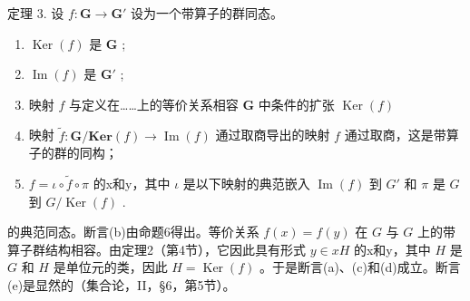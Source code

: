 定理 3. 设 \(f: \mathbf{G} \to \mathbf{G}'\) 设为一个带算子的群同态。

\begin{enumerate}
\def\labelenumi{(\alph{enumi})}
\item
  \(\operatorname{Ker}(f)\) 是 \(\mathbf{G}\) ;
\item
  \(\operatorname{Im}(f)\) 是 \(\mathbf{G}'\) ;
\item
  映射 \(f\) 与定义在……上的等价关系相容 \(\mathbf{G}\) 中条件的扩张 \(\operatorname{Ker}(f)\)
\item
  映射 \(\tilde{f}\colon \mathbf{G} / \mathbf{Ker}(f)\to \operatorname {Im}(f)\) 通过取商导出的映射 \(f\) 通过取商，这是带算子的群的同构；
\item
  \(f = \iota \circ \tilde{f} \circ \pi\) 的x和y，其中 \(\iota\) 是以下映射的典范嵌入 \(\operatorname{Im}(f)\) 到 \(G'\) 和 \(\pi\) 是 \(G\) 到 \(G / \operatorname{Ker}(f)\) .
\end{enumerate}

的典范同态。断言(b)由命题6得出。等价关系 \(f(x) = f(y)\) 在 \(G\) 与 \(G\) 上的带算子群结构相容。由定理2（第4节），它因此具有形式 \(y \in xH\) 的x和y，其中 \(H\) 是 \(G\) 和 \(H\) 是单位元的类，因此 \(H = \operatorname{Ker}(f)\) 。于是断言(a)、(c)和(d)成立。断言(e)是显然的（集合论，II，§6，第5节）。

